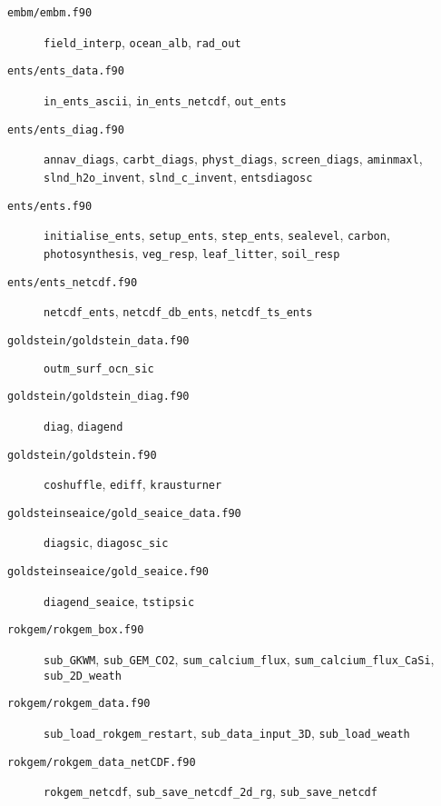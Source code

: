 \documentclass[a4paper,10pt,article]{memoir}
\begin{document}
\begin{description}
  \item[\texttt{embm/embm.f90}]{\texttt{field\_interp},
    \texttt{ocean\_alb}, \texttt{rad\_out}}

  \item[\texttt{ents/ents\_data.f90}]{\texttt{in\_ents\_ascii},
    \texttt{in\_ents\_netcdf}, \texttt{out\_ents}}

  \item[\texttt{ents/ents\_diag.f90}]{\texttt{annav\_diags},
    \texttt{carbt\_diags}, \texttt{physt\_diags},
    \texttt{screen\_diags}, \texttt{aminmaxl},
    \texttt{slnd\_h2o\_invent}, \texttt{slnd\_c\_invent},
    \texttt{entsdiagosc}}

  \item[\texttt{ents/ents.f90}]{\texttt{initialise\_ents},
    \texttt{setup\_ents}, \texttt{step\_ents}, \texttt{sealevel},
    \texttt{carbon}, \texttt{photosynthesis}, \texttt{veg\_resp},
    \texttt{leaf\_litter}, \texttt{soil\_resp}}

  \item[\texttt{ents/ents\_netcdf.f90}]{\texttt{netcdf\_ents},
    \texttt{netcdf\_db\_ents}, \texttt{netcdf\_ts\_ents}}

  \item[\texttt{goldstein/goldstein\_data.f90}]{\texttt{outm\_surf\_ocn\_sic}}

  \item[\texttt{goldstein/goldstein\_diag.f90}]{\texttt{diag}, \texttt{diagend}}

  \item[\texttt{goldstein/goldstein.f90}]{\texttt{coshuffle}, \texttt{ediff},
    \texttt{krausturner}}

  \item[\texttt{goldsteinseaice/gold\_seaice\_data.f90}]{\texttt{diagsic},
    \texttt{diagosc\_sic}}

  \item[\texttt{goldsteinseaice/gold\_seaice.f90}]{\texttt{diagend\_seaice},
    \texttt{tstipsic}}

  \item[\texttt{rokgem/rokgem\_box.f90}]{\texttt{sub\_GKWM},
    \texttt{sub\_GEM\_CO2}, \texttt{sum\_calcium\_flux},
    \texttt{sum\_calcium\_flux\_CaSi}, \texttt{sub\_2D\_weath}}

  \item[\texttt{rokgem/rokgem\_data.f90}]{
    \texttt{sub\_load\_rokgem\_restart},
    \texttt{sub\_data\_input\_3D}, \texttt{sub\_load\_weath}}

  \item[\texttt{rokgem/rokgem\_data\_netCDF.f90}]{\texttt{rokgem\_netcdf},
    \texttt{sub\_save\_netcdf\_2d\_rg}, \texttt{sub\_save\_netcdf}}


\end{description}
\end{document}
